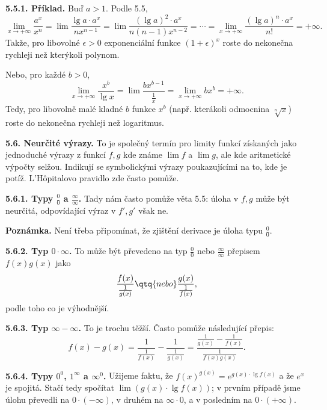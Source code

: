 \documentclass[12pt]{article}
\begin{document}
{\medskip

{\bf 5.5.1. Příklad.}  Buď $a>1$. Podle 5.5,
$$
\lim_{x\to+\infty}\frac{a^x}{x^n}=\lim\frac{\lg a\cdot a^x}{nx^{n-1}}
=\lim\frac{(\lg a)^2\cdot a^x}{n(n-1)x^{n-2}}=\cdots
=\lim_{x\to+\infty}\frac{(\lg a)^n\cdot a^x}{n!}=+\infty.
$$
Takže, pro libovolné $\epsilon>0$ exponenciální funkce $(1+\epsilon)^x$ roste do nekonečna rychleji než kterýkoli polynom.

Nebo, pro každé $b>0$,
$$
\lim_{x\to+\infty}\frac{x^b}{\lg x}=\lim\frac{bx^{b-1}}{\frac{1}{x}}
=\lim_{x\to+\infty}bx^b=+\infty.
$$
Tedy, pro libovolně malé kladné $b$ funkce $x^b$ (např. kterákoli odmocnina $\sqrt[n]x$) roste do nekonečna rychleji než logaritmus.

\bigskip

{\bf 5.6. Neurčité výrazy.} To je společný termín pro limity funkcí získaných jako jednoduché výrazy z funkcí $f,g$ kde známe $\lim f$ a $\lim g$, ale kde aritmetické výpočty selžou.
Indikují se symbolickými výrazy poukazujícími na to, kde je potíž.  L'H\^{o}pitalovo pravidlo zde často pomůže.

\medskip

{\bf 5.6.1. Typy $\frac{0}{0}$  a $\frac{\infty}{\infty}$.} Tady nám často pomůže věta 5.5: úloha v $f,g$ může být neurčitá, odpovídající výraz v $f',g'$ však ne.

\smallskip

{\bf Poznámka.} Není třeba připomínat, že zjištění derivace je úloha typu $\frac00$.

\medskip



{\bf 5.6.2. Typ $0\cdot\infty$.} To může být převedeno na typ
$\frac{0}{0}$ nebo $\frac{\infty}{\infty}$ přepisem $f(x)g(x)$ jako 
$$
\frac{f(x)}{\frac{1}{g(x)}} \qtq{nebo} \frac{g(x)}{\frac{1}{f(x)}},
$$
podle toho co je výhodnější.

\medskip

{\bf 5.6.3. Typ $\infty-\infty$.} To je trochu těžší. Často pomůže následující přepis:
$$
f(x)-g(x)=\frac{1}{\frac{1}{f(x)}}-\frac{1}{\frac{1}{g(x)}}=
\frac{\frac{1}{g(x)}-\frac{1}{f(x)}}{\frac{1}{f(x)g(x)}}.
$$

\medskip

{\bf 5.6.4. Typy $0^0$, $1^\infty$ a $\infty^0$.} Užijeme faktu, že $f(x)^{g(x)}= e^{g(x)\cdot\lg f(x)}$ a že $e^x$ je spojitá. Stačí tedy spočítat $\lim(g(x)\cdot\lg f(x))$; v prvním případě jsme úlohu převedli na $0\cdot(-\infty)$, v druhém na $\infty\cdot 0$, a v posledním na
$0\cdot(+\infty)$.


}
\end{document}
